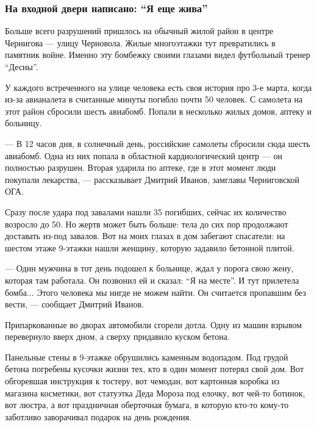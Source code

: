  
 
 
 
 

\subsubsection{На входной двери написано: \enquote{Я еще жива}}
\label{sec:17_04_2022.stz.news.ua.strana.1.chernigov.4.zhiva}

Больше всего разрушений пришлось на обычный жилой район в центре Чернигова —
улицу Черновола. Жилые многоэтажки тут превратились в памятник войне. Именно
эту бомбежку своими глазами видел футбольный тренер \enquote{Десны}.


У каждого встреченного на улице человека есть своя история про 3-е марта, когда
из-за авианалета в считанные минуты погибло почти 50 человек. С самолета на
этот район сбросили шесть авиабомб. Попали в несколько жилых домов, аптеку и
больницу. 

— В 12 часов дня, в солнечный день, российские самолеты сбросили сюда шесть
авиабомб. Одна из них попала в областной кардиологический центр — он полностью
разрушен. Вторая ударила по аптеке, где в этот момент люди покупали лекарства,
— рассказывает Дмитрий Иванов, замглавы Черниговской ОГА.

Сразу после удара под завалами нашли 35 погибших, сейчас их количество возросло
до 50. Но жертв может быть больше: тела до сих пор продолжают доставать из-под
завалов. Вот на моих глазах в дом забегают спасатели: на шестом этаже 9-этажки
нашли женщину, которую задавило бетонной плитой. 

— Один мужчина в тот день подошел к больнице, ждал у порога свою жену, которая
там работала. Он позвонил ей и сказал: \enquote{Я на месте}. И тут прилетела бомба...
Этого человека мы нигде не можем найти. Он считается пропавшим без вести, —
сообщает Дмитрий Иванов. 

Припаркованные во дворах автомобили сгорели дотла. Одну из машин взрывом
перевернуло вверх дном, а сверху придавило куском бетона. 

Панельные стены в 9-этажке обрушились каменным водопадом. Под грудой бетона
погребены кусочки жизни тех, кто в один момент потерял свой дом. Вот обгоревшая
инструкция к тостеру, вот чемодан, вот картонная коробка из магазина косметики,
вот статуэтка Деда Мороза под елочку, вот чей-то ботинок, вот люстра, а вот
праздничная оберточная бумага, в которую кто-то кому-то заботливо заворачивал
подарок на день рождения.

